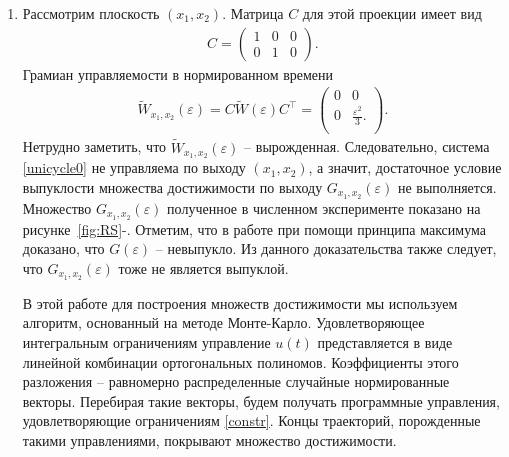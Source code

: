 \documentclass[../main.tex]{subfiles}
\begin{document}
	\begin{enumerate}
		\item Рассмотрим плоскость $ (x_1, x_2) $. Матрица $ C $ для этой проекции имеет вид
		\begin{gather*}
			C = \begin{pmatrix}
				1 & 0 & 0 \\
				0 & 1 & 0
			\end{pmatrix}.
		\end{gather*}
		Грамиан управляемости в нормированном времени
		\begin{gather*}
			\widetilde{W}_{x_1,x_2}(\varepsilon) =  C \widetilde{W} (\varepsilon) C^{\top}  =\begin{pmatrix}
				0 & 0 \\
				0 & \frac{\varepsilon^2}{3}. \\
			\end{pmatrix}.
		\end{gather*}
		Нетрудно заметить, что $ \widetilde{W}_{x_1,x_2}(\varepsilon) $ -- вырожденная. Следовательно, система \eqref{unicycle0} не управляема по выходу $ (x_1, x_2) $, а значит, достаточное условие выпуклости множества достижимости по выходу $ G_{x_1,x_2}(\varepsilon) $ не выполняется. Множество $ G_{x_1,x_2}(\varepsilon) $ полученное в численном эксперименте показано на рисунке~\ref{fig:RS}-. Отметим, что в работе \cite{GusevOsipovTrudy} при помощи принципа максимума доказано, что $ G(\varepsilon) $ -- невыпукло. Из данного доказательства также следует, что $ G_{x_1,x_2}(\varepsilon) $ тоже не является выпуклой.
		
		В этой работе для построения множеств достижимости мы используем алгоритм, основанный на методе Монте-Карло. %
		Удовлетворяющее интегральным ограничениям управление $ u(t) $ представляется в виде линейной комбинации ортогональных полиномов. Коэффициенты этого разложения -- равномерно распределенные случайные нормированные векторы. Перебирая такие векторы, будем получать программные управления, удовлетворяющие ограничениям \eqref{constr}. Концы траекторий, порожденные такими управлениями, покрывают множество достижимости.
		

\end{enumerate}
\end{document}
